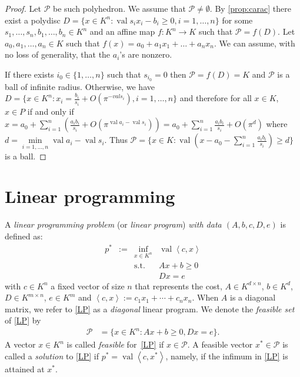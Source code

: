 \documentclass[a4paper,oneside,10pt]{article}
\newcommand{\PP}{\mathcal{P}}
\DeclareMathOperator{\val}{val}
\begin{document}
\begin{proof}
    Let $\mathcal{P}$ be such polyhedron. We assume that $\mathcal{P} \neq \emptyset$. By \ref{prop:carac} there exist a polydisc $D = \{x \in K^n : \val s_i x_i - b_i \ge 0, i=1,\ldots,n \}$ for some $s_1,\ldots,s_n, b_1,\ldots,b_n \in K ^n$ and an affine map $f : K^n \to K$ such that $\mathcal{P} = f(D)$. Let $a_0,a_1,\ldots,a_n \in K$ such that $f(x) = a_0 + a_1 x_1 + \ldots + a_n x_n$. We can assume, with no loss of generality, that the $a_i$'s are nonzero. 

If there exists $i_0 \in \{1,\ldots,n\}$ such that $s_{i_0} = 0$ then $\mathcal{P} = f(D) = K$ and $\mathcal{P}$ is a ball of infinite radius. Otherwise, we have $D = \{x \in K^n : x_i = \frac{b_i}{s_i} + O\left( \pi^{-val s_i} \right), i=1,\ldots,n \}$ and therefore for all $x \in  K$, $x \in P$ if and only if $x = a_0 + \sum_{i=1}^{n}( \frac{a_i b_i}{s_i} + O\left( \pi^{\val a_i - \val s_i} \right))= a_0  + \sum_{i=1}^{n} \frac{a_i b_i}{s_i} + O(\pi^d)$ where $d = \min \limits_{i = 1,\ldots,n} \val a_i - \val s_i$. Thus $\mathcal{P} = \{x \in K : \val (x - a_0 - \sum_{i=1}^{n} \frac{a_i b_i}{s_i}) \ge d \}$ is a ball.

\end{proof}





\section{Linear programming}

A \emph{linear programming problem} (or \emph{linear program}) \emph{with data $(A,b,c,D,e)$} is defined
as:
\begin{equation}
  \tag{LP}\label{LP}
\begin{array}{rcll}
  p^* & := & \inf_{x \in K^n} & \val \left\langle c, x \right\rangle \\
  &    & \text{s.t.}         & A x + b \geq 0\\
  & & & D x = e
\end{array}
\end{equation}
with $c \in K^n$ a fixed vector of size $n$ that represents the cost,
$A \in K^{d \times n}$, $b \in K^d$, $D \in K^{m\times n}$, $e \in K^m$ 
and $\left\langle c, x \right\rangle := c_1 x_1+\cdots +c_n x_n$.
When $A$ is a diagonal matrix,
we refer to \eqref{LP} as a \emph{diagonal} linear program.
We denote the \emph{feasible set} of \eqref{LP} by
\begin{equation*}
\begin{aligned}
  \PP  &= \{x \in K^n : Ax + b \geq 0, Dx = e\}.
\end{aligned}
\end{equation*}
A vector $x \in K^n$ is called \emph{feasible} for~\eqref{LP} if $x \in \PP$. A feasible vector $x^* \in \PP$ is called a \emph{solution} to \eqref{LP} if $p^* = \val\left\langle c,x^*\right\rangle$, namely, if the infimum in \eqref{LP} is attained at $x^*$.
\end{document}
